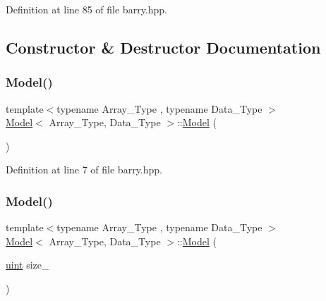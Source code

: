Definition at line 85 of file barry.\+hpp.



\subsection{Constructor \& Destructor Documentation}
\mbox{\label{classbarry_1_1_model_a38122122aa4eb799b90ed1ee49b9410c}} 
\subsubsection{\texorpdfstring{Model()}{Model()}\hspace{0.1cm}{\footnotesize\ttfamily [1/2]}}
{\footnotesize\ttfamily template$<$typename Array\+\_\+\+Type , typename Data\+\_\+\+Type $>$ \\
\hyperlink{classbarry_1_1_model}{Model}$<$ Array\+\_\+\+Type, Data\+\_\+\+Type $>$\+::\hyperlink{classbarry_1_1_model}{Model} (\begin{DoxyParamCaption}{ }\end{DoxyParamCaption})\hspace{0.3cm}{\ttfamily [inline]}}



Definition at line 7 of file barry.\+hpp.

\mbox{\label{classbarry_1_1_model_a841a883c666ecd9b07385bfb36078bc5}} 
\subsubsection{\texorpdfstring{Model()}{Model()}\hspace{0.1cm}{\footnotesize\ttfamily [2/2]}}
{\footnotesize\ttfamily template$<$typename Array\+\_\+\+Type , typename Data\+\_\+\+Type $>$ \\
\hyperlink{classbarry_1_1_model}{Model}$<$ Array\+\_\+\+Type, Data\+\_\+\+Type $>$\+::\hyperlink{classbarry_1_1_model}{Model} (\begin{DoxyParamCaption}\item[{\hyperlink{namespacebarry_a11dfc53ddb4672278319aa04f1e09a6c}{uint}}]{size\+\_\+ }\end{DoxyParamCaption})\hspace{0.3cm}{\ttfamily [inline]}}



